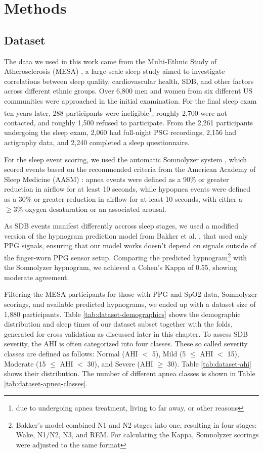 \chapter{Methods \label{Chapter-Methods}}

\section{Dataset}

The data we used in this work came from the Multi-Ethnic Study of Atherosclerosis (MESA) \cite{chen2015racial}, a large-scale sleep study aimed to investigate correlations between sleep quality, cardiovascular health, SDB, and other factors across different ethnic groups.
Over 6,800 men and women from six different US communities were approached in the initial examination. For the final sleep exam ten years later, 288 participants were ineligible\footnote{due to undergoing apnea treatment, living to far away, or other reasons}, roughly 2,700 were not contacted, and roughly 1,500 refused to participate. From the 2,261 participants undergoing the sleep exam, 2,060 had full-night PSG recordings, 2,156 had actigraphy data, and 2,240 completed a sleep questionnaire.

For the sleep event scoring, we used the automatic Somnolyzer system , which scored events based on the recommended criteria from the American Academy of Sleep Medicine (AASM) : apnea events were defined as a 90\% or greater reduction in airflow for at least 10 seconds, while hypopnea events were defined as a 30\% or greater reduction in airflow for at least 10 seconds, with either a $\geq 3\%$ oxygen desaturation or an associated arousal. 

As SDB events manifest differently accross sleep stages, we used a modified version of the hypnogram prediction model from Bakker et al. \cite{bakker2021estimating}, that used only PPG signals, ensuring that our model works doesn't depend on signals outside of the finger-worn PPG sensor setup. Comparing the predicted hypnogram\footnote{Bakker's model combined N1 and N2 stages into one, resulting in four stages: Wake, N1/N2, N3, and REM. For calculating the Kappa, Somnolyzer scorings were adjusted to the same format} with the Somnolyzer hypnogram, we achieved a Cohen's Kappa of 0.55, showing moderate agreement.

Filtering the MESA participants for those with PPG and SpO2 data, Somnolyzer scorings, and available predicted hypnograms, we ended up with a dataset size of 1,880 participants. Table \ref{tab:dataset-demographics} shows the demographic distribution and sleep times of our dataset subset together with the folds, generated for cross validation as discussed later in this chapter.
To assess SDB severity, the AHI is often categorized into four classes. These so called severity classes are defined as follows: Normal (AHI $<$ 5), Mild (5 $\le$ AHI $<$ 15), Moderate (15 $\le$ AHI $<$ 30), and Severe (AHI $\ge$ 30).
Table \ref{tab:dataset-ahi} shows their distribution.
The number of different apnea classes is shown in Table \ref{tab:dataset-apnea-classes}.

